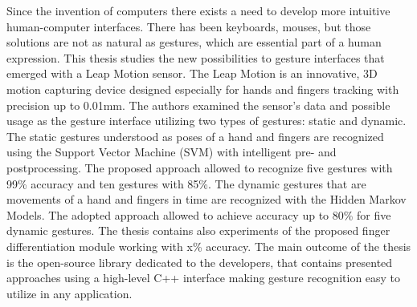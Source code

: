 Since the invention of computers there exists a need to develop more intuitive human-computer interfaces.
There has been keyboards, mouses, but those solutions are not as natural as gestures, which are essential part of a human expression.
This thesis studies the new possibilities to gesture interfaces that emerged with a Leap Motion sensor.
The Leap Motion is an innovative, 3D motion capturing device designed especially for hands and fingers tracking with precision up to 0.01mm.
The authors examined the sensor's data and possible usage as the gesture interface utilizing two types of gestures: static and dynamic.
The static gestures understood as poses of a hand and fingers are recognized using the Support Vector Machine (SVM) with intelligent pre- and postprocessing.
The proposed approach allowed to recognize five gestures with 99\% accuracy and ten gestures with 85\%.
The dynamic gestures that are movements of a hand and fingers in time are recognized with the Hidden Markov Models. 
The adopted approach allowed to achieve accuracy up to 80\% for five dynamic gestures.
The thesis contains also experiments of the proposed finger differentiation module working with x\% accuracy.
The main outcome of the thesis is the open-source library dedicated to the developers, that contains presented approaches using a high-level C++ interface making gesture recognition easy to utilize in any application.